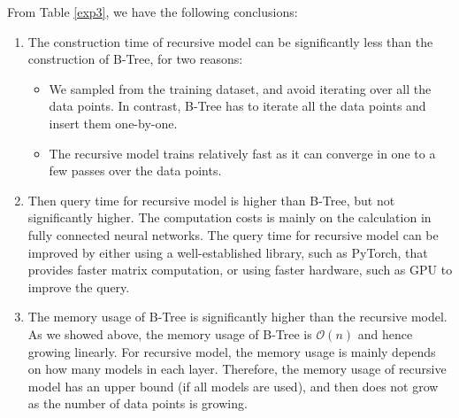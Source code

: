 \begin{mscconclusion}
	From Table \ref{exp3}, we have the following conclusions:
	\begin{enumerate}
		\item The construction time of recursive model can be significantly less than the construction of B-Tree, for two reasons: 
			\begin{itemize}
				\item We sampled from the training dataset, and avoid iterating over all the data points. In contrast, B-Tree has to iterate all the data points and insert them one-by-one.
				\item The recursive model trains relatively fast as it can converge in one to a few passes over the data points.
			\end{itemize}
			\item Then query time for recursive model is higher than B-Tree, but not significantly higher. The computation costs is mainly on the calculation in fully connected neural networks. The query time for recursive model can be improved by either using a well-established library, such as PyTorch, that provides faster matrix computation, or using faster hardware, such as GPU to improve the query.
			\item The memory usage of B-Tree is significantly higher than the recursive model. As we showed above, the memory usage of B-Tree is $\mathcal{O}(n)$ and hence growing linearly. For recursive model, the memory usage is mainly depends on how many models in each layer. Therefore, the memory usage of recursive model has an upper bound (if all models are used), and then does not grow as the number of data points is growing.
	\end{enumerate}
\end{mscconclusion}









